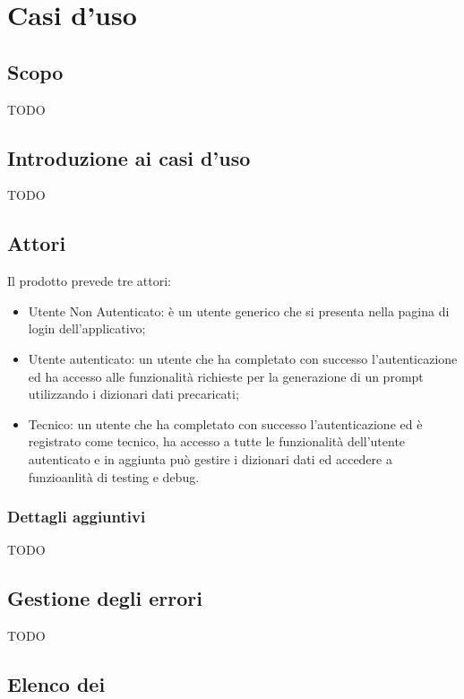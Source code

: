 \section{Casi d'uso}

\subsection{Scopo}
TODO
\subsection{Introduzione ai casi d'uso}
TODO

\subsection{Attori}
Il prodotto prevede tre attori:
\begin{itemize}
  \item Utente Non Autenticato: è un utente generico che si presenta nella pagina di login dell'applicativo;
  \item Utente autenticato: un utente che ha completato con successo l'autenticazione ed ha accesso alle funzionalità richieste per la generazione di un prompt utilizzando i dizionari dati precaricati;
  \item Tecnico: un utente che ha completato con successo l'autenticazione ed è registrato come tecnico, ha accesso a tutte le funzionalità dell'utente autenticato e in aggiunta può gestire i dizionari dati ed accedere a funzioanlità di testing e debug.
\end{itemize}

\subsubsection{Dettagli aggiuntivi}
TODO

\subsection{Gestione degli errori}
TODO

\subsection{Elenco dei }

